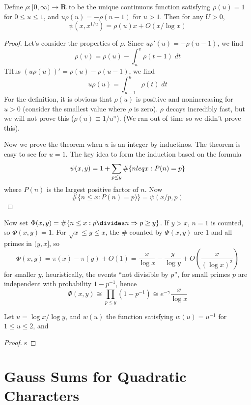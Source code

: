 \begin{theorem}[Dickman, 1930]
    Define $\rho: [0,\infty) \to \mathbf{R}$ to be the unique continuous function satisfying $\rho(u) = 1$ for $0 \leq u \leq 1$, and $u \rho(u) = - \rho(u-1)$ for $u > 1$. Then for any $U > 0$,
    \[ \psi(x,x^{1/u}) = \rho(u)x + O(x/\log x) \]
\end{theorem}
\begin{proof}
    Let's consider the properties of $\rho$. Since $u \rho'(u) = - \rho(u-1)$, we find
    \[ \rho(v) = \rho(u) - \int_u^v \rho(t-1)\; dt \]
    THus $(u \rho(u))' = \rho(u) - \rho(u-1)$, we find
    \[ u\rho(u) = \int_{u-1}^u \rho(t)\; dt \]
    For the definition, it is obvious that $\rho(u)$ is positive and nonincreasing for $u > 0$ (consider the smallest value where $\rho$ is zero). $\rho$ decays incredibly fast, but we will not prove this ($\rho(u) \equiv 1/u^u$). (We ran out of time so we didn't prove this).

    Now we prove the theorem when $u$ is an integer by inductinos. The theorem is easy to see for $u = 1$. The key idea to form the induction based on the formula
    \[ \psi(x,y) = 1 + \sum_{p \leq y} \# \{ n \\leq x: P(n) = p \} \]
    where $P(n)$ is the largest positive factor of $n$. Now
    \[ \# \{ n \leq x: P(n) = p) \} = \psi(x/p, p) \]
\end{proof}

Now set $\Phi(x,y) = \# \{ n \leq x: p \divides n \Rightarrow p \geq y \}$. If $y > x$, $n = 1$ is counted, so $\Phi(x,y) = 1$. For $\sqrt{x} \leq y \leq x$, the $\#$ counted by $\Phi(x,y)$ are 1 and all primes in $(y,x]$, so
%
\[ \Phi(x,y) = \pi(x) - \pi(y) + O(1) = \frac{x}{\log x} - \frac{y}{\log y} + O \left( \frac{x}{(\log x)^2} \right) \]
%
for smaller $y$, heuristically, the events ``not divisible by $p$'', for small primes $p$ are independent with probability $1 - p^{-1}$, hence
%
\[ \Phi(x,y) \cong \prod_{p \leq y} (1 - p^{-1}) \cong e^{-\gamma} \frac{x}{\log x} \]

\begin{theorem}[Buchstab]
    Let $u = \log x / \log y$, and $w(u)$ the function satisfying $w(u) = u^{-1}$ for $1 \leq u \leq 2$, and 
\end{theorem}
\begin{proof}
    s
\end{proof}

\section{Gauss Sums for Quadratic Characters}

